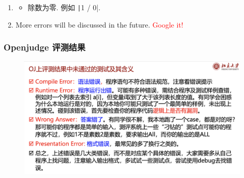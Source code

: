 \documentclass{ctexbeamer}
\begin{document}
\begin{frame}
\begin{enumerate}
\begin{itemize}
            \end{itemize}
            \item<5-> 
            \begin{itemize}
                \item 除数为零. 例如 \texttt|1 / 0|.
            \end{itemize}
            \item<6-> More errors will be discussed in the future. \textcolor{red}{Google it!}
        \end{enumerate}
    \end{frame}

        \begin{frame}
            \frametitle{Openjudge 评测结果}
            \begin{figure}
                \centering
                \includegraphics[width=1\textwidth]{./images/openjudge.png}
            \end{figure}
        \end{frame}
\end{document}
